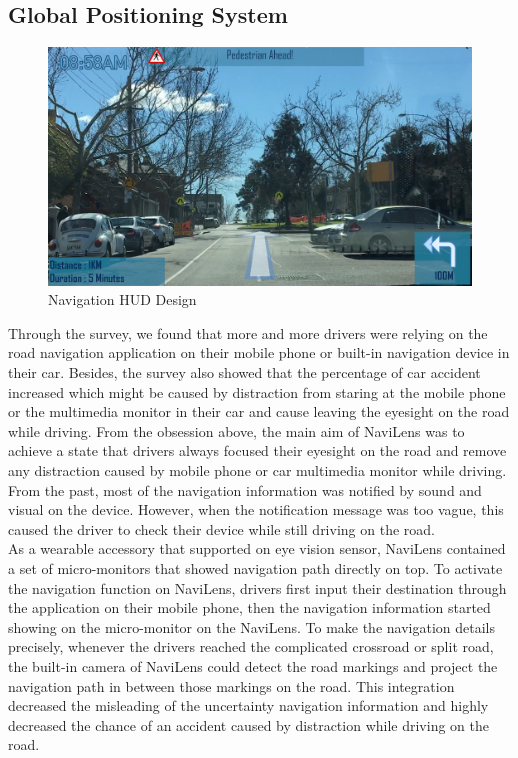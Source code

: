 \documentclass{chi-ext}
\begin{document}
\begin{multicols}{2}
\subsection{Global Positioning System}

\begin{figure}
 \includegraphics[width=\columnwidth]{gui.png}
 \caption{Navigation HUD Design}
 \label{fig:gui}
\end{figure}

Through the survey, we found that more and more drivers were relying on the road navigation application on their mobile phone or built-in navigation device in their car. Besides, the survey also showed that the percentage of car accident increased which might be caused by distraction from staring at the mobile phone or the multimedia monitor in their car and cause leaving the eyesight on the road while driving. From the obsession above, the main aim of NaviLens was to achieve a state that drivers always focused their eyesight on the road and remove any distraction caused by mobile phone or car multimedia monitor while driving. From the past, most of the navigation information was notified by sound and visual on the device. However, when the notification message was too vague, this caused the driver to check their device while still driving on the road.\\

As a wearable accessory that supported on eye vision sensor, NaviLens contained a set of micro-monitors that showed navigation path directly on top. To activate the navigation function on NaviLens, drivers first input their destination through the application on their mobile phone, then the navigation information started showing on the micro-monitor on the NaviLens. To make the navigation details precisely, whenever the drivers reached the complicated crossroad or split road, the built-in camera of NaviLens could detect the road markings and project the navigation path in between those markings on the road. This integration decreased the misleading of the uncertainty navigation information and highly decreased the chance of an accident caused by distraction while driving on the road.\\


\end{multicols}
\end{document}
